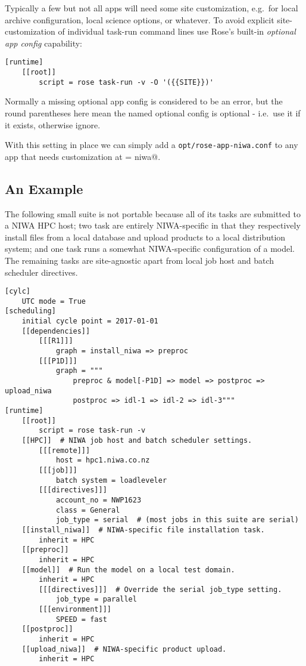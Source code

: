 Typically a few but not all apps will need some site customization, e.g.\ for
local archive configuration, local science options, or whatever. To avoid
explicit site-customization of individual task-run command lines use Rose's
built-in {\em optional app config} capability:

\lstset{language=suiterc}
\begin{lstlisting}
[runtime]
    [[root]]
        script = rose task-run -v -O '({{SITE}})'
\end{lstlisting}

Normally a missing optional app config is considered to be an error, but the 
round parentheses here mean the named optional config is optional - i.e.\
use it if it exists, otherwise ignore.

With this setting in place we can simply add a
\lstinline=opt/rose-app-niwa.conf= to any app that needs customization at
\lstinline@SITE = niwa@.

\subsection{An Example}

The following small suite is not portable because all of its tasks are
submitted to a NIWA HPC host; two task are entirely NIWA-specific in that they 
respectively install files from a local database and upload products to a local
distribution system; and one task runs a somewhat NIWA-specific configuration
of a model. The remaining tasks are site-agnostic apart from local job host
and batch scheduler directives.

\lstset{language=suiterc}
\begin{lstlisting}
[cylc]
    UTC mode = True
[scheduling]
    initial cycle point = 2017-01-01
    [[dependencies]]
        [[[R1]]]
            graph = install_niwa => preproc
        [[[P1D]]]
            graph = """
                preproc & model[-P1D] => model => postproc => upload_niwa
                postproc => idl-1 => idl-2 => idl-3"""
[runtime]
    [[root]]
        script = rose task-run -v
    [[HPC]]  # NIWA job host and batch scheduler settings.
        [[[remote]]]
            host = hpc1.niwa.co.nz
        [[[job]]]
            batch system = loadleveler
        [[[directives]]]
            account_no = NWP1623
            class = General
            job_type = serial  # (most jobs in this suite are serial)
    [[install_niwa]]  # NIWA-specific file installation task.
        inherit = HPC
    [[preproc]]
        inherit = HPC
    [[model]]  # Run the model on a local test domain.
        inherit = HPC
        [[[directives]]]  # Override the serial job_type setting.
            job_type = parallel
        [[[environment]]]
            SPEED = fast
    [[postproc]]
        inherit = HPC
    [[upload_niwa]]  # NIWA-specific product upload.
        inherit = HPC
\end{lstlisting}

